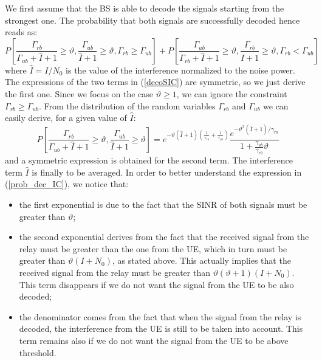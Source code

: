 \documentclass[12pt, letterpaper, onecolumn, draftcls]{IEEEtran}
\begin{document}
We first assume that the BS is able to decode the signals starting from the strongest one. The probability that both signals are successfully decoded hence reads as:
\begin{equation}
 P\left[\frac{\Gamma_{rb}}{\Gamma_{ub}+\hat{I}+1}\geq\vartheta, \frac{\Gamma_{ub}}{\hat{I}+1}\geq\vartheta, \Gamma_{rb}\geq \Gamma_{ub}\right] + P\left[\frac{\Gamma_{ub}}{\Gamma_{rb}+\hat{I}+1}\geq\vartheta, \frac{\Gamma_{rb}}{\hat{I}+1}\geq\vartheta, \Gamma_{rb}< \Gamma_{ub}\right]
 \label{decoSIC}
\end{equation}
where $\hat{I}=I/N_0$ is the value of the interference normalized to the noise power. The expressions of the two terms in (\ref{decoSIC}) are symmetric, so we just derive the first one. Since we focus on the case $\vartheta\geq 1$, we can ignore the constraint $\Gamma_{rb}\geq \Gamma_{ub}$. From the distribution of the random variables $\Gamma_{rb}$ and $\Gamma_{ub}$ we can easily derive, for a given value of $\hat{I}$:
\begin{equation}
 P\left[\frac{\Gamma_{rb}}{\Gamma_{ub}+\hat{I}+1}\geq\vartheta, \frac{\Gamma_{ub}}{\hat{I}+1}\geq\vartheta\right] = e^{-\vartheta(\hat{I}+1)\left(\frac{1}{\gamma_{rb}} + \frac{1}{\gamma_{ub}}\right)}\frac{e^{-\vartheta^2(\hat{I}+1)/\gamma_{rb}}}{1+\frac{\gamma_{ub}}{\gamma_{rb}}\vartheta}
 \label{prob_dec_IC}
\end{equation}
and a symmetric expression is obtained for the second term. The interference term $\hat{I}$ is finally to be averaged. In order to better understand the expression in (\ref{prob_dec_IC}), we notice that:
\begin{itemize}
 \item the first exponential is due to the fact that the SINR of both signals must be greater than $\vartheta$;
 \item the second exponential derives from the fact that the received signal from the relay must be greater than the one from the UE, which in turn must be greater than $\vartheta(I+N_0)$, as stated above. This actually implies that the received signal from the relay must be greater than $\vartheta(\vartheta+1)(I+N_0)$. This term disappears if we do not want the signal from the UE to be also decoded;
 \item the denominator comes from the fact that when the signal from the relay is decoded, the interference from the UE is still to be taken into account. This term remains also if we do not want the signal from the UE to be above threshold.
\end{itemize}
\end{document}
